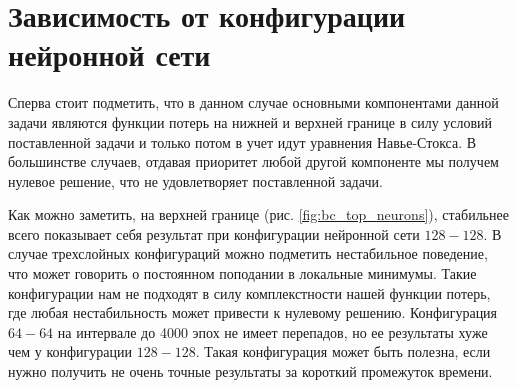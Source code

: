 \section{Зависимость от конфигурации нейронной сети}

Сперва стоит подметить, что в данном случае основными компонентами данной задачи
являются функции потерь на нижней и верхней границе в силу условий поставленной
задачи и только потом в учет идут уравнения Навье-Стокса. В большинстве случаев,
отдавая приоритет любой другой компоненте мы получем нулевое решение, что не
удовлетворяет поставленной задачи.

Как можно заметить, на верхней границе (рис. \ref{fig:bc_top_neurons}), стабильнее
всего показывает себя результат при конфигурации нейронной сети $128-128$. В
случае трехслойных конфигураций можно подметить нестабильное поведение, что
может говорить о постоянном поподании в локальные минимумы. Такие конфигурации
нам не подходят в силу комплекстности нашей функции потерь, где любая
нестабильность может привести к нулевому решению. Конфигурация $64-64$
на интервале до 4000 эпох не имеет перепадов, но ее результаты хуже
чем у конфигурации $128-128$. Такая конфигурация может быть полезна, 
если нужно получить не очень точные результаты за короткий промежуток
времени.


